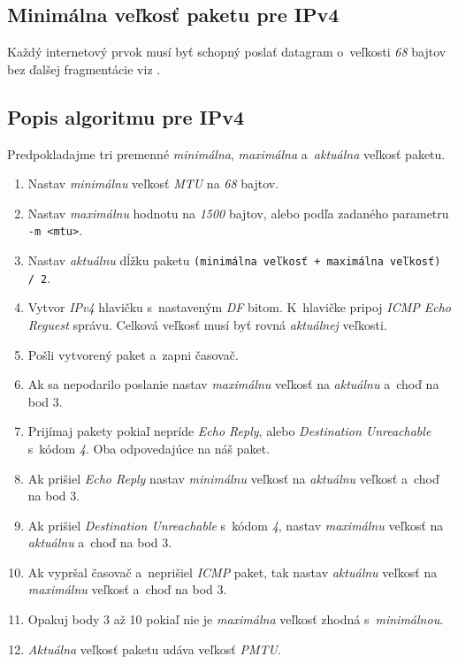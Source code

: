 \documentclass[12pt,a4paper,titlepage]{article}
\begin{document}
    \subsection{Minimálna veľkosť paketu pre IPv4} 
        Každý internetový prvok musí byť schopný poslať datagram o~veľkosti \emph{68}
        bajtov bez ďalšej fragmentácie viz \cite{rfc_ip}.

    \subsection{Popis algoritmu pre IPv4} \label{algoritmus_ipv4} 
        Predpokladajme tri premenné \emph{minimálna}, \emph{maximálna} a~\emph{aktuálna} veľkosť paketu.

    \begin{enumerate}
        \item Nastav \emph{minimálnu} veľkosť \emph{MTU} na \emph{68} bajtov.
        \item Nastav \emph{maximálnu} hodnotu na \emph{1500} bajtov, alebo
            podľa zadaného parametru \texttt{-m <mtu>}.
        \item Nastav \emph{aktuálnu} dĺžku paketu \texttt{(minimálna veľkosť + maximálna veľkosť) / 2}.
        \item Vytvor \emph{IPv4} hlavičku s~nastaveným \emph{DF} bitom. K~hlavičke
            pripoj \emph{ICMP Echo Reguest} správu. Celková veľkosť musí byť rovná \emph{aktuálnej} veľkosti.
        \item Pošli vytvorený paket a~zapni časovač.
        \item Ak sa nepodarilo poslanie nastav \emph{maximálnu} veľkosť na \emph{aktuálnu}
            a~choď na bod 3.
        \item Prijímaj pakety pokiaľ nepríde \emph{Echo Reply},
            alebo \emph{Destination Unreachable} s~kódom \emph{4}. Oba odpovedajúce na náš paket.
        \item Ak prišiel \emph{Echo Reply} nastav \emph{minimálnu} veľkosť na \emph{aktuálnu}
            veľkosť a~choď na bod 3.
        \item Ak prišiel \emph{Destination Unreachable} s~kódom \emph{4}, 
            nastav \emph{maximálnu} veľkosť na \emph{aktuálnu} a~choď na bod 3.
        \item Ak vypršal časovač a~neprišiel \emph{ICMP} paket, tak nastav \emph{aktuálnu}
            veľkosť na \emph{maximálnu} veľkosť a~choď na bod 3.
        \item Opakuj body 3 až 10 pokiaľ nie je \emph{maximálna} veľkosť zhodná
                    s~\emph{minimálnou}.
        \item \emph{Aktuálna} veľkosť paketu udáva veľkosť \emph{PMTU}.
    \end{enumerate}
\end{document}

